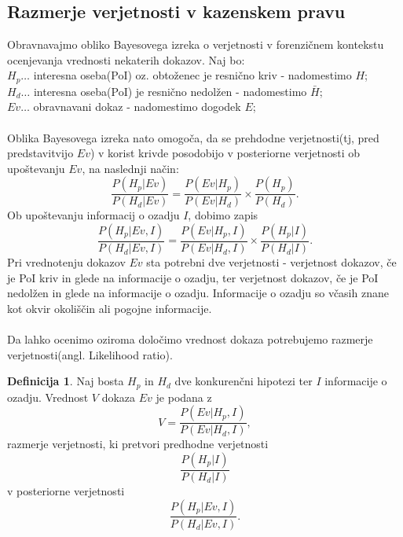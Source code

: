 \documentclass[12pt,a4paper]{amsart}
\theoremstyle{definition} %
\newtheorem{definicija}{Definicija}[section]
\theoremstyle{plain} %
\begin{document}
\subsection{Razmerje verjetnosti v kazenskem pravu}
Obravnavajmo obliko Bayesovega izreka o verjetnosti v forenzičnem kontekstu ocenjevanja vrednosti nekaterih dokazov. Naj bo:\\
$H_p \dots$ interesna oseba(PoI) oz. obtoženec je resnično kriv - nadomestimo $H$;\\
$H_d \dots$ interesna oseba(PoI) je resnično nedolžen - nadomestimo $\bar{H}$;\\
$Ev \dots$ obravnavani dokaz - nadomestimo dogodek $E$;\\\\
Oblika Bayesovega izreka nato omogoča, da se prehdodne verjetnosti(tj, pred predstavitvijo $Ev$) v korist krivde posodobijo v posteriorne 
verjetnosti ob upoštevanju $Ev$, na naslednji način:
\[
    \frac{P(H_p \lvert Ev)}{P(H_d \lvert Ev)} = \frac{P(Ev \lvert H_p)}{P(Ev \lvert H_d)} \times \frac{P(H_p)}{P(H_d)}.
\]
Ob upoštevanju informacij o ozadju $I$, dobimo zapis
\[
    \frac{P(H_p \lvert Ev, I)}{P(H_d \lvert Ev, I)} = \frac{P(Ev \lvert H_p, I)}{P(Ev \lvert H_d, I)} \times \frac{P(H_p \lvert I)}{P(H_d \lvert I)}.
\]
Pri vrednotenju dokazov $Ev$ sta potrebni dve verjetnosti - verjetnost dokazov, če je PoI kriv in glede na informacije o ozadju, ter 
verjetnost dokazov, če je PoI nedolžen in glede na informacije o ozadju. Informacije o ozadju so včasih znane kot okvir okoliščin 
ali pogojne informacije. \\\\
Da lahko ocenimo oziroma določimo vrednost dokaza potrebujemo razmerje verjetnosti(angl. Likelihood ratio).
\begin{definicija}
    Naj bosta  $H_p$ in $H_d$ dve konkurenčni hipotezi ter $I$ informacije o ozadju. Vrednost $V$ dokaza $Ev$ je podana z 
    \[
        V = \frac{P(Ev \lvert H_p, I)}{P(Ev \lvert H_d, I)},
    \]
    razmerje verjetnosti, ki pretvori predhodne verjetnosti 
    \[
        \frac{P(H_p \lvert I)}{P(H_d \lvert I)}
    \]
    v posteriorne verjetnosti 
    \[
        \frac{P(H_p \lvert Ev, I)}{P(H_d \lvert Ev, I)}.
    \]
\end{definicija}
\end{document}
